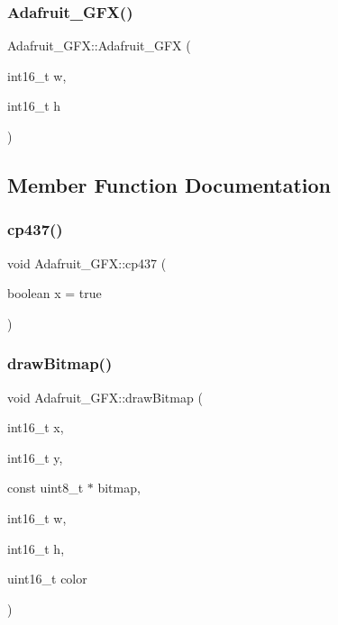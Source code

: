 \subsubsection{\texorpdfstring{Adafruit\+\_\+\+G\+F\+X()}{Adafruit\_GFX()}}
{\footnotesize\ttfamily Adafruit\+\_\+\+G\+F\+X\+::\+Adafruit\+\_\+\+G\+FX (\begin{DoxyParamCaption}\item[{int16\+\_\+t}]{w,  }\item[{int16\+\_\+t}]{h }\end{DoxyParamCaption})}



\subsection{Member Function Documentation}
\mbox{\label{class_adafruit___g_f_x_a6d447fe274e3f0ff12f12afa538d0afe}} 
\subsubsection{\texorpdfstring{cp437()}{cp437()}}
{\footnotesize\ttfamily void Adafruit\+\_\+\+G\+F\+X\+::cp437 (\begin{DoxyParamCaption}\item[{boolean}]{x = {\ttfamily true} }\end{DoxyParamCaption})}

\mbox{\label{class_adafruit___g_f_x_a50bf54503493152eeefa36f9768acec2}} 
\subsubsection{\texorpdfstring{draw\+Bitmap()}{drawBitmap()}\hspace{0.1cm}{\footnotesize\ttfamily [1/2]}}
{\footnotesize\ttfamily void Adafruit\+\_\+\+G\+F\+X\+::draw\+Bitmap (\begin{DoxyParamCaption}\item[{int16\+\_\+t}]{x,  }\item[{int16\+\_\+t}]{y,  }\item[{const uint8\+\_\+t $\ast$}]{bitmap,  }\item[{int16\+\_\+t}]{w,  }\item[{int16\+\_\+t}]{h,  }\item[{uint16\+\_\+t}]{color }\end{DoxyParamCaption})}

